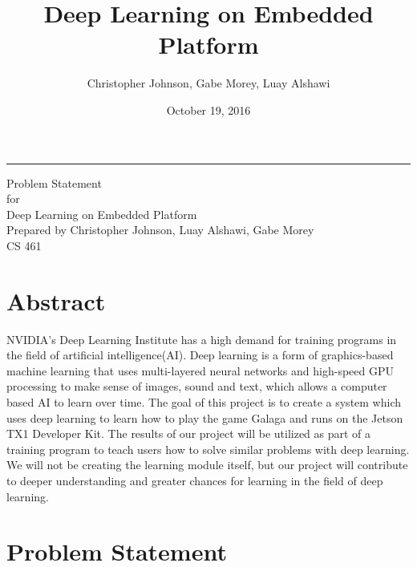 \documentclass{scrreprt}
\author{Christopher Johnson, Gabe Morey, Luay Alshawi}
\title{Deep Learning on Embedded Platform}
\date{October 19, 2016}
\begin{document}
\begin{flushright}
    \rule{16cm}{5pt}\vskip1cm
    \begin{bfseries}
        \Huge{Problem Statement}\\
        \vspace{1.9cm}
        for\\
        \vspace{1.9cm}
        Deep Learning on Embedded Platform\\
        \vspace{1.9cm}
        Prepared by Christopher Johnson, Luay Alshawi, Gabe Morey\\
        \vspace{1.9cm}
        CS 461\\
    \end{bfseries}
\end{flushright}

\tableofcontents

\chapter{Abstract}
NVIDIA's Deep Learning Institute has a high demand for training programs in the field of artificial intelligence(AI).
Deep learning is a form of graphics-based machine learning that uses multi-layered neural networks and high-speed GPU processing to make sense of images, sound and text, which allows a computer based AI to learn over time.
The goal of this project is to create a system which uses deep learning to learn how to play the game Galaga and runs on the Jetson TX1 Developer Kit.
The results of our project will be utilized as part of a training program to teach users how to solve similar problems with deep learning.
We will not be creating the learning module itself, but our project will contribute to deeper understanding and greater chances for learning in the field of deep learning.

\chapter{Problem Statement}
\end{document}
